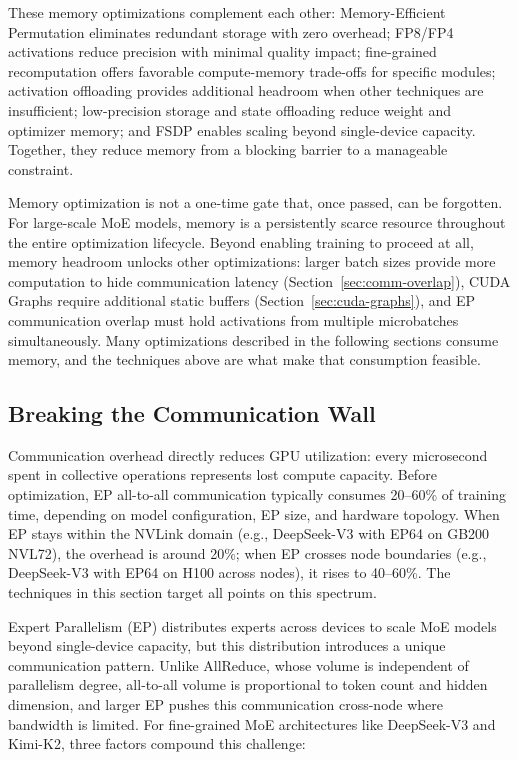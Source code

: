 \documentclass[10pt,logo,copyright]{nvidiatechreport}
\begin{document}
These memory optimizations complement each other: Memory-Efficient Permutation eliminates redundant storage with zero overhead; FP8/FP4 activations reduce precision with minimal quality impact; fine-grained recomputation offers favorable compute-memory trade-offs for specific modules; activation offloading provides additional headroom when other techniques are insufficient; low-precision storage and state offloading reduce weight and optimizer memory; and FSDP enables scaling beyond single-device capacity. Together, they reduce memory from a blocking barrier to a manageable constraint.

Memory optimization is not a one-time gate that, once passed, can be forgotten. For large-scale MoE models, memory is a persistently scarce resource throughout the entire optimization lifecycle. Beyond enabling training to proceed at all, memory headroom unlocks other optimizations: larger batch sizes provide more computation to hide communication latency (Section~\ref{sec:comm-overlap}), CUDA Graphs require additional static buffers (Section~\ref{sec:cuda-graphs}), and EP communication overlap must hold activations from multiple microbatches simultaneously. Many optimizations described in the following sections consume memory, and the techniques above are what make that consumption feasible.

\subsection{Breaking the Communication Wall}\label{sec:comm-wall}

Communication overhead directly reduces GPU utilization: every microsecond spent in collective operations represents lost compute capacity. Before optimization, EP all-to-all communication typically consumes 20--60\% of training time, depending on model configuration, EP size, and hardware topology. When EP stays within the NVLink domain (e.g., DeepSeek-V3 with EP64 on GB200 NVL72), the overhead is around 20\%; when EP crosses node boundaries (e.g., DeepSeek-V3 with EP64 on H100 across nodes), it rises to 40--60\%. The techniques in this section target all points on this spectrum.

Expert Parallelism (EP) distributes experts across devices to scale MoE models beyond single-device capacity, but this distribution introduces a unique communication pattern. Unlike AllReduce, whose volume is independent of parallelism degree, all-to-all volume is proportional to token count and hidden dimension, and larger EP pushes this communication cross-node where bandwidth is limited. For fine-grained MoE architectures like DeepSeek-V3 and Kimi-K2, three factors compound this challenge:
\end{document}
